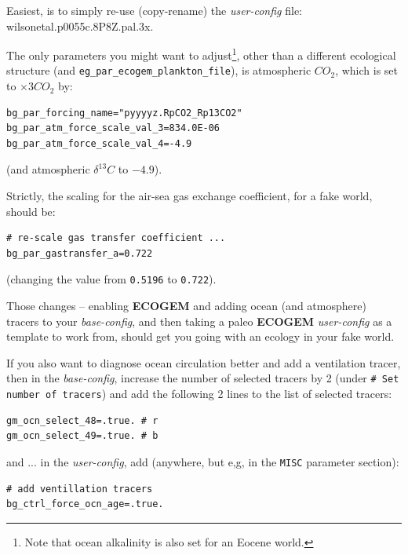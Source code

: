 \begin{enumerate}[noitemsep]
Easiest, is to simply re-use (copy-rename) the  \textit{user-config} file: \textsf{\footnotesize wilsonetal.p0055c.8P8Z.pal.3x}.

\vspace{1mm}
The only parameters you might want to adjust\footnote{Note that ocean alkalinity is also set for an Eocene world.}, other than a different ecological structure (and \texttt{eg\_par\_ecogem\_plankton\_file}), is atmospheric \(CO_{2}\), which is set to \(\times 3 CO_{2}\) by:
\small\begin{verbatim}
bg_par_forcing_name="pyyyyz.RpCO2_Rp13CO2"
bg_par_atm_force_scale_val_3=834.0E-06
bg_par_atm_force_scale_val_4=-4.9
\end{verbatim}\normalsize
(and atmospheric \(\delta^{13}C\) to \(-4.9\)).

\vspace{1mm}
Strictly, the scaling for the air-sea gas exchange coefficient, for a fake world, should be:
\footnotesize\begin{verbatim}
# re-scale gas transfer coefficient ...
bg_par_gastransfer_a=0.722
\end{verbatim}\normalsize
(changing the value from \texttt{0.5196} to \texttt{0.722}).

\end{enumerate}

\pagebreak

Those changes -- enabling \textbf{ECOGEM} and adding ocean (and atmosphere) tracers to your \textit{base-config}, and then taking a paleo \textbf{ECOGEM} \textit{user-config} as a template to work from, should get you going with an ecology in your fake world.

\vspace{1mm}
If you also want to diagnose ocean circulation better and add a ventilation tracer, then in the \textit{base-config}, increase the number of selected tracers by 2 (under \texttt{\# Set number of tracers}) and add the following 2 lines to the list of selected tracers:
\footnotesize\begin{verbatim}
gm_ocn_select_48=.true. # r
gm_ocn_select_49=.true. # b
\end{verbatim}\normalsize
and ... in the \textit{user-config}, add (anywhere, but e,g, in the \texttt{MISC} parameter section):
\footnotesize\begin{verbatim}
# add ventillation tracers
bg_ctrl_force_ocn_age=.true.
\end{verbatim}\normalsize



